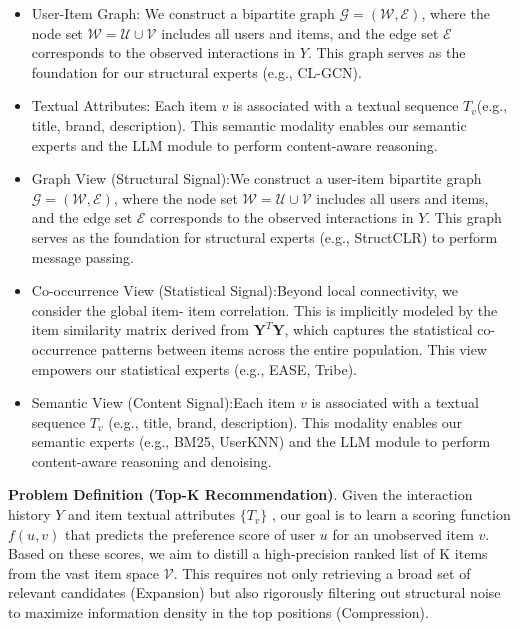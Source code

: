 \documentclass[]{article}
\begin{document}
\begin{itemize}
\item
  User-Item Graph: We construct a bipartite graph
  \(\mathcal{G} = \left( \mathcal{W},\mathcal{E} \right)\), where the
  node set \(\mathcal{W} = \mathcal{U} \cup \mathcal{V}\) includes all
  users and items, and the edge set \(\mathcal{E}\) corresponds to the
  observed interactions in \(Y\). This graph serves as the foundation
  for our structural experts (e.g., CL-GCN).
\item
  Textual Attributes: Each item \(v\) is associated with a textual
  sequence \(T_{v}\)(e.g., title, brand, description). This semantic
  modality enables our semantic experts and the LLM module to perform
  content-aware reasoning.
\item
  Graph View (Structural Signal):We construct a user-item bipartite
  graph \(\mathcal{G} = \left( \mathcal{W},\mathcal{E} \right)\), where
  the node set \(\mathcal{W} = \mathcal{U} \cup \mathcal{V}\) includes
  all users and items, and the edge set \(\mathcal{E}\) corresponds to
  the observed interactions in \(Y\). This graph serves as the
  foundation for structural experts (e.g., StructCLR) to perform message
  passing.
\item
  Co-occurrence View (Statistical Signal):Beyond local connectivity, we
  consider the global item- item correlation. This is implicitly modeled
  by the item similarity matrix derived from
  \(\mathbf{Y}^{T}\mathbf{Y}\), which captures the statistical
  co-occurrence patterns between items across the entire population.
  This view empowers our statistical experts (e.g., EASE, Tribe).
\item
  Semantic View (Content Signal):Each item \(v\) is associated with a
  textual sequence \(T_{v}\) (e.g., title, brand, description). This
  modality enables our semantic experts (e.g., BM25, UserKNN) and the
  LLM module to perform content-aware reasoning and denoising.
\end{itemize}

\textbf{Problem Definition (Top-K Recommendation)}. Given the
interaction history \(Y\) and item textual attributes \(\{ T_{v}\}\) ,
our goal is to learn a scoring function \(f\left( u,v \right)\) that
predicts the preference score of user \(u\) for an unobserved item
\(v\). Based on these scores, we aim to distill a high-precision ranked
list of K items from the vast item space \(\mathcal{V}\). This requires
not only retrieving a broad set of relevant candidates (Expansion) but
also rigorously filtering out structural noise to maximize information
density in the top positions (Compression).
\end{document}
